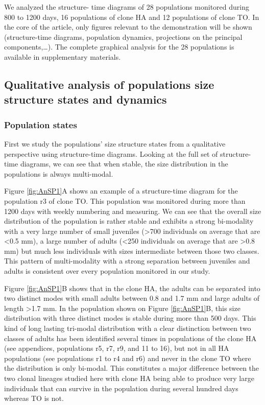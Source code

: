 We analyzed the structure- time diagrams of 28 populations monitored during 800
to 1200 days, 16 populations of clone HA and 12 populations of clone TO. In the
core of the article, only figures relevant to the demonstration will be shown
(structure-time diagrams, population dynamics, projections on the principal
components,\ldots). The complete graphical analysis for the 28 populations is
available in supplementary materials.

\subsection{Qualitative analysis of populations size structure states and
dynamics}

\subsubsection{Population states}

First we study the populations’ size structure states from a qualitative
perspective using structure-time diagrams.  Looking at the full set of
structure-time diagrams, we can see that when stable, the size distribution in
the populations is always multi-modal.

Figure \ref{fig:AnSP1}A shows an example of a structure-time diagram for the
population r3 of clone TO. This population was monitored during more than 1200 days with weekly
numbering and measuring. We can see that the overall size distribution of the
population is rather stable and exhibits a strong bi-modality with a very large
number of small juveniles (>700 individuals on average that are <0.5 mm), a
large number of adults (<250 individuals on average that are >0.8 mm) but much
less individuals with sizes intermediate between those two classes. This pattern
of multi-modality with a strong separation between juveniles and adults is
consistent over every population monitored in our study.

Figure \ref{fig:AnSP1}B shows that in the clone HA, the adults can be separated
into two distinct modes with small adults between 0.8 and 1.7 mm and large adults of
length >1.7 mm. In the population shown on Figure \ref{fig:AnSP1}B, this size distribution
with three distinct modes is stable during more than 500 days. This kind of long
lasting tri-modal distribution with a clear distinction between two classes of
adults has been identified several times in populations of the clone HA (see
appendices, populations r5, r7, r9, and 11 to 16), but not in all HA populations
(see populations r1 to r4 and r6) and never in the clone TO where the
distribution is only bi-modal. This constitutes a major difference between the
two clonal lineages studied here with clone HA being able to produce very large
individuals that can survive in the population during several hundred days
whereas TO is not.

